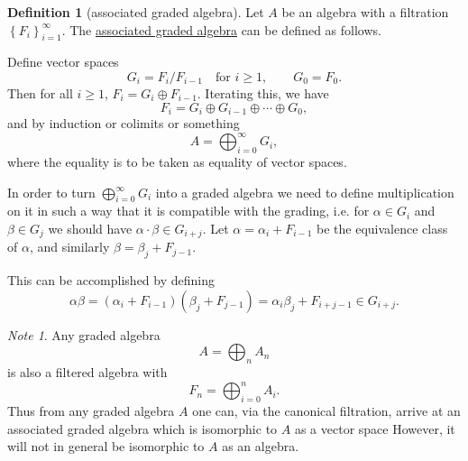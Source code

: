 \documentclass[a4paper,10pt]{scrreprt}
\newcommand{\defn}[1]{\ul{#1}}
\theoremstyle{definition}
\newtheorem{definition}{Definition}[section]
\theoremstyle{plain}
\theoremstyle{remark}
\newtheorem{note}{Note}[section]
\begin{document}
\begin{definition}[associated graded algebra]
  Let $A$ be an algebra with a filtration $\left\{ F_{i} \right\}_{i = 1}^{\infty}$. The \defn{associated graded algebra} can be defined as follows. 

  Define vector spaces
  \begin{equation*}
    G_{i} = F_{i}/F_{i-1}\quad \text{for }i \geq 1,\qquad G_{0} = F_{0}.
  \end{equation*}
  Then for all $i \geq 1$, $F_{i} = G_{i}\oplus F_{i-1}$. Iterating this, we have
  \begin{equation*}
    F_{i} = G_{i} \oplus G_{i-1} \oplus \cdots \oplus G_{0},
  \end{equation*}
  and by induction or colimits or something
  \begin{equation*}
    A = \bigoplus_{i=0}^{\infty} G_{i},
  \end{equation*}
  where the equality is to be taken as equality of vector spaces.

  In order to turn $\bigoplus_{i=0}^{\infty} G_{i}$ into a graded algebra we need to define multiplication on it in such a way that it is compatible with the grading, i.e. for $\alpha \in G_{i}$ and $\beta \in G_{j}$ we should have $\alpha\cdot\beta \in G_{i+j}$. Let $\alpha = \alpha_{i} + F_{i-1}$ be the equivalence class of $\alpha$, and similarly $\beta = \beta_{j} + F_{j-1}$.

  This can be accomplished by defining
  \begin{equation*}
    \alpha\beta = (\alpha_{i} + F_{i-1})(\beta_{j} + F_{j-1}) = \alpha_{i}\beta_{j} + F_{i+j-1} \in G_{i+j}.
  \end{equation*}
\end{definition}

\begin{note}
  Any graded algebra
  \begin{equation*}
    A = \bigoplus_{n} A_{n}
  \end{equation*}
  is also a filtered algebra with
  \begin{equation*}
    F_{n} = \bigoplus_{i=0}^{n} A_{i}.
  \end{equation*}
  Thus from any graded algebra $A$ one can, via the canonical filtration, arrive at an associated graded algebra which is isomorphic to $A$ as a vector space However, it will not in general be isomorphic to $A$ as an algebra.
\end{note}
\end{document}
